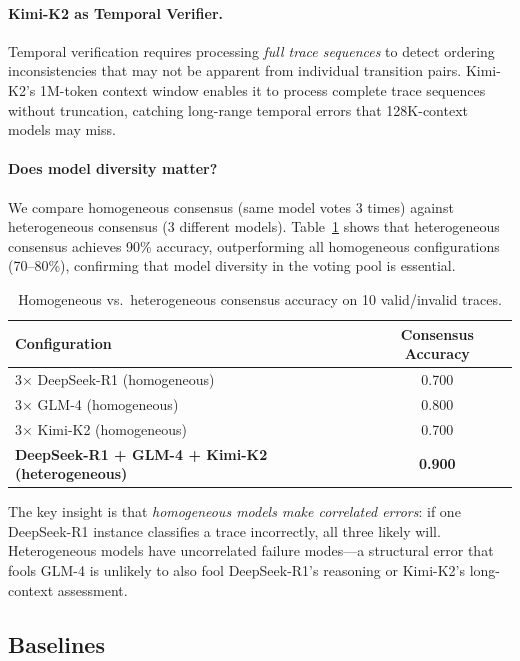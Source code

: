 \documentclass[11pt,a4paper]{article}
\begin{document}
\paragraph{Kimi-K2 as Temporal Verifier.} Temporal verification requires processing \emph{full trace sequences} to detect ordering inconsistencies that may not be apparent from individual transition pairs. Kimi-K2's 1M-token context window enables it to process complete trace sequences without truncation, catching long-range temporal errors that 128K-context models may miss.

\paragraph{Does model diversity matter?} We compare homogeneous consensus (same model votes 3 times) against heterogeneous consensus (3 different models). Table~\ref{tab:homo_hetero} shows that heterogeneous consensus achieves 90\% accuracy, outperforming all homogeneous configurations (70--80\%), confirming that model diversity in the voting pool is essential.

\begin{table}[t]
\centering
\caption{Homogeneous vs.\ heterogeneous consensus accuracy on 10 valid/invalid traces.}
\label{tab:homo_hetero}
\begin{tabular}{lc}
\toprule
\textbf{Configuration} & \textbf{Consensus Accuracy} \\
\midrule
3$\times$ DeepSeek-R1 (homogeneous) & 0.700 \\
3$\times$ GLM-4 (homogeneous) & 0.800 \\
3$\times$ Kimi-K2 (homogeneous) & 0.700 \\
\textbf{DeepSeek-R1 + GLM-4 + Kimi-K2 (heterogeneous)} & \textbf{0.900} \\
\bottomrule
\end{tabular}
\end{table}

The key insight is that \emph{homogeneous models make correlated errors}: if one DeepSeek-R1 instance classifies a trace incorrectly, all three likely will. Heterogeneous models have uncorrelated failure modes---a structural error that fools GLM-4 is unlikely to also fool DeepSeek-R1's reasoning or Kimi-K2's long-context assessment.

\subsection{Baselines}
\end{document}
